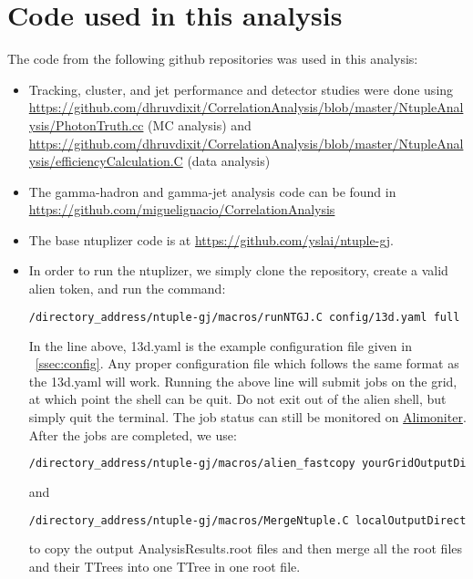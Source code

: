\section{Code used in this analysis}
\label{AnalysisCode}
The code from the following github repositories was used in this analysis:
\begin{itemize}
\item Tracking, cluster, and jet performance and detector studies were done using \url{https://github.com/dhruvdixit/CorrelationAnalysis/blob/master/NtupleAnalysis/PhotonTruth.cc} (MC analysis) and \url{ 
https://github.com/dhruvdixit/CorrelationAnalysis/blob/master/NtupleAnalysis/efficiencyCalculation.C} (data analysis)
\item The gamma-hadron and gamma-jet analysis code can be found in \url{https://github.com/miguelignacio/CorrelationAnalysis}
\item The base ntuplizer code is at \url{https://github.com/yslai/ntuple-gj}.
\item In order to run the ntuplizer, we simply clone the repository, create a valid alien token, and run the command:
\begin{lstlisting}[language=sh]
/directory_address/ntuple-gj/macros/runNTGJ.C config/13d.yaml full
\end{lstlisting}
In the line above, 13d.yaml is the example configuration file given in ~\ref{ssec:config}. Any proper configuration file which follows the same format as the 13d.yaml will work. Running the above line will submit jobs on the grid, at which point the shell can be quit. Do not exit out of the alien shell, but simply quit the terminal. The job status can still be monitored on \href{https://alimonitor.cern.ch/users/jobs.jsp}{Alimoniter}. After the jobs are completed, we use:
\begin{lstlisting}[language=sh]
/directory_address/ntuple-gj/macros/alien_fastcopy yourGridOutputDirectory/OutputFolder localOutputDirectory/OutputFolder
\end{lstlisting}
and
\begin{lstlisting}[language=sh]
/directory_address/ntuple-gj/macros/MergeNtuple.C localOutputDirectory/OutputFolder/*/*/AnalysisResults.root ntuple_name.root
\end{lstlisting}
to copy the output AnalysisResults.root files and then merge all the root files and their TTrees into one TTree in one root file.
\end{itemize}